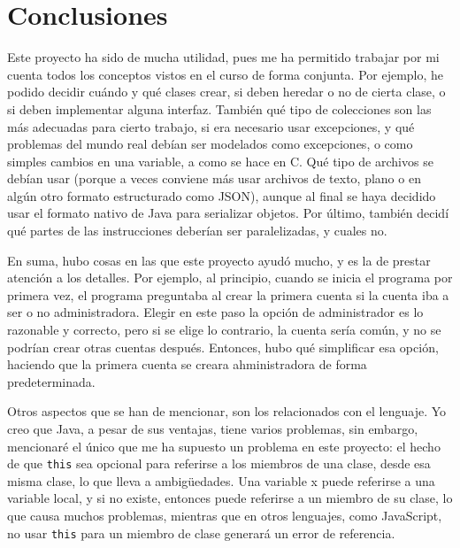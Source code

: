 \documentclass[letterpaper,12pt]{article}
\begin{document}
\section{Conclusiones}
Este proyecto ha sido de mucha utilidad, pues me ha permitido trabajar por mi cuenta todos los conceptos vistos en el curso de forma conjunta. Por ejemplo, he podido decidir cuándo y qué clases crear, si deben heredar o no de cierta clase, o si deben implementar alguna interfaz. También qué tipo de colecciones son las más adecuadas para cierto trabajo, si era necesario usar excepciones, y qué problemas del mundo real debían ser modelados como excepciones, o como simples cambios en una variable, a como se hace en C. Qué tipo de archivos se debían usar (porque a veces conviene más usar archivos de texto, plano o en algún otro formato estructurado como JSON), aunque al final se haya decidido usar el formato nativo de Java para serializar objetos. Por último, también decidí qué partes de las instrucciones deberían ser paralelizadas, y cuales no.

En suma, hubo cosas en las que este proyecto ayudó mucho, y es la de prestar atención a los detalles. Por ejemplo, al principio, cuando se inicia el programa por primera vez, el programa preguntaba al crear la primera cuenta si la cuenta iba a ser o no administradora. Elegir en este paso la opción de administrador es lo razonable y correcto, pero si se elige lo contrario, la cuenta sería común, y no se podrían crear otras cuentas después. Entonces, hubo qué simplificar esa opción, haciendo que la primera cuenta se creara ahministradora de forma predeterminada.

Otros aspectos que se han de mencionar, son los relacionados con el lenguaje. Yo creo que Java, a pesar de sus ventajas, tiene varios problemas, sin embargo, mencionaré el único que me ha supuesto un problema en este proyecto: el hecho de que \texttt{this} sea opcional para referirse a los miembros de una clase, desde esa misma clase, lo que lleva a ambigüedades. Una variable x puede referirse a una variable local, y si no existe, entonces puede referirse a un miembro de su clase, lo que causa muchos problemas, mientras que en otros lenguajes, como JavaScript, no usar \texttt{this} para un miembro de clase generará un error de referencia.
\end{document}

